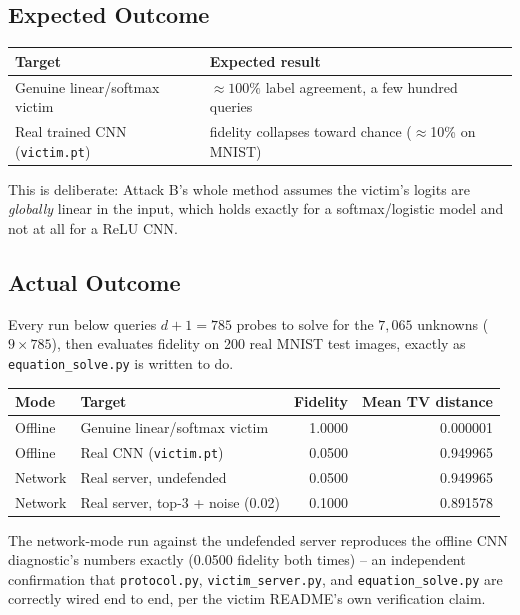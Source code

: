 \documentclass[11pt]{article}
\begin{document}
\subsection{Expected Outcome}

\begin{center}
\begin{tabular}{@{}ll}
\toprule
\textbf{Target} & \textbf{Expected result} \\
\midrule
Genuine linear/softmax victim & $\approx100\%$ label agreement, a few hundred queries \\
Real trained CNN (\texttt{victim.pt}) & fidelity collapses toward chance ($\approx$10\% on MNIST) \\
\bottomrule
\end{tabular}
\end{center}

This is deliberate: Attack B's whole method assumes the victim's logits are
\emph{globally} linear in the input, which holds exactly for a softmax/logistic
model and not at all for a ReLU CNN.

\subsection{Actual Outcome}

Every run below queries $d+1 = 785$ probes to solve for the $7{,}065$
unknowns ($9\times785$), then evaluates fidelity on 200 real MNIST test
images, exactly as \texttt{equation\_solve.py} is written to do.

\begin{center}
\begin{tabular}{@{}llrr@{}}
\toprule
\textbf{Mode} & \textbf{Target} & \textbf{Fidelity} & \textbf{Mean TV distance} \\
\midrule
Offline & Genuine linear/softmax victim & 1.0000 & 0.000001 \\
Offline & Real CNN (\texttt{victim.pt}) & 0.0500 & 0.949965 \\
Network & Real server, undefended & 0.0500 & 0.949965 \\
Network & Real server, top-3 + noise (0.02) & 0.1000 & 0.891578 \\
\bottomrule
\end{tabular}
\end{center}

The network-mode run against the undefended server reproduces the offline
CNN diagnostic's numbers exactly (0.0500 fidelity both times) -- an
independent confirmation that \texttt{protocol.py}, \texttt{victim\_server.py},
and \texttt{equation\_solve.py} are correctly wired end to end, per the
victim README's own verification claim.
\end{document}
